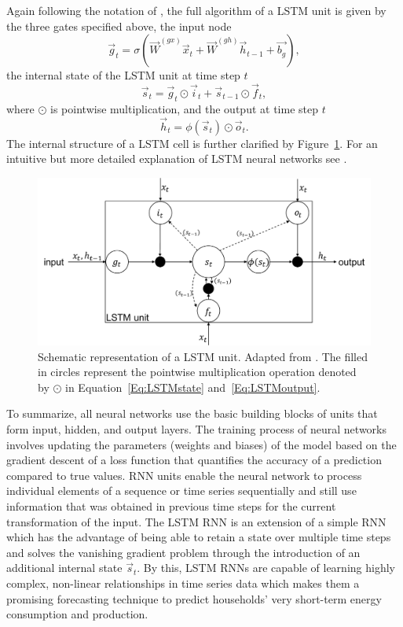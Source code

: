 Again following the notation of \citet{Lipton:2015}, the full algorithm of a LSTM unit is given by the three gates specified above, the input node
%
\begin{equation} \label{Eq:LSTMinput}
    \vec{g}_t=\sigma\left(\vec{W}^{(gx)}\vec{x}_t+\vec{W}^{(gh)}\vec{h}_{t-1}+\vec{b_g}\right),
\end{equation}
%
the internal state of the LSTM unit at time step $t$
%
\begin{equation} \label{Eq:LSTMstate}
    \vec{s}_t=\vec{g}_t\odot\vec{i}_t+\vec{s}_{t-1}\odot\vec{f}_t,
\end{equation}
%
where $\odot$ is pointwise multiplication, and the output at time step $t$
%
\begin{equation} \label{Eq:LSTMoutput}
    \vec{h}_t=\phi\left(\vec{s}_t\right)\odot\vec{o}_t.
\end{equation}
%
The internal structure of a LSTM cell is further clarified by Figure~\ref{Fig:LSTMunit}. For an intuitive but more detailed explanation of LSTM neural networks see \citet[][Ch. 6.2]{Chollet:2018}.
%
\begin{figure}[H]
    \centering
    \includegraphics[scale=0.5]{thesis/figures/LSTMunit.pdf}
    \caption[Schematic representation of a LSTM unit]{Schematic representation of a LSTM unit. Adapted from \citet{Graves:2012}. The filled in circles represent the pointwise multiplication operation denoted by $\odot$ in Equation~\ref{Eq:LSTMstate} and~\ref{Eq:LSTMoutput}.}
    \label{Fig:LSTMunit}
\end{figure}

To summarize, all neural networks use the basic building blocks of units that form input, hidden, and output layers. The training process of neural networks involves updating the parameters (weights and biases) of the model based on the gradient descent of a loss function that quantifies the accuracy of a prediction compared to true values. RNN units enable the neural network to process individual elements of a sequence or time series sequentially and still use information that was obtained in previous time steps for the current transformation of the input. The LSTM RNN is an extension of a simple RNN which has the advantage of being able to retain a state over multiple time steps and solves the vanishing gradient problem through the introduction of an additional internal state $\vec{s}_t$. By this, LSTM RNNs are capable of learning highly complex, non-linear relationships in time series data which makes them a promising forecasting technique to predict households' very short-term energy consumption and production.



